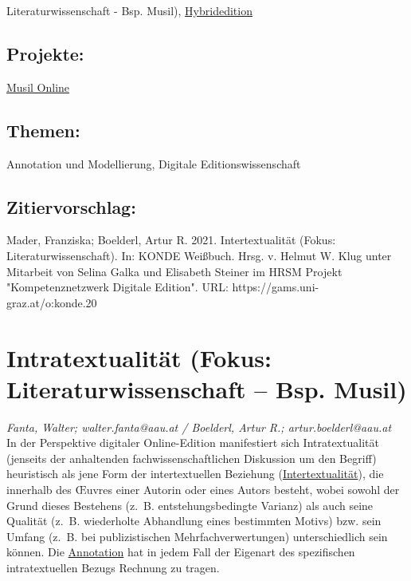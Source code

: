 \documentclass{article}
\begin{document}
{                           Literaturwissenschaft - Bsp. Musil)}, \href{https://gams.uni-graz.at/o:konde.96}{Hybridedition}\subsection*{Projekte:}\href{http://musilonline.at}{Musil Online}\subsection*{Themen:}Annotation und Modellierung, Digitale Editionswissenschaft\subsection*{Zitiervorschlag:}Mader, Franziska; Boelderl, Artur R. 2021. Intertextualität (Fokus: Literaturwissenschaft). In: KONDE Weißbuch. Hrsg. v. Helmut W. Klug unter Mitarbeit von Selina Galka und Elisabeth Steiner im HRSM Projekt "Kompetenznetzwerk Digitale Edition". URL: https://gams.uni-graz.at/o:konde.20\newpage\section*{Intratextualität (Fokus: Literaturwissenschaft – Bsp. Musil)} \emph{Fanta, Walter; walter.fanta@aau.at / Boelderl, Artur R.;
                  artur.boelderl@aau.at}\\
        
    In der Perspektive digitaler Online-Edition manifestiert sich Intratextualität
                  (jenseits der anhaltenden fachwissenschaftlichen Diskussion um den Begriff)
                  heuristisch als jene Form der intertextuellen Beziehung (\href{http://gams.uni-graz.at/o:konde.20}{Intertextualität}), die innerhalb des Œuvres einer
                  Autorin oder eines Autors besteht, wobei sowohl der Grund dieses Bestehens (z. B.
                  entstehungsbedingte Varianz) als auch seine Qualität (z. B. wiederholte Abhandlung
                  eines bestimmten Motivs) bzw. sein Umfang (z. B. bei publizistischen
                  Mehrfachverwertungen) unterschiedlich sein können. Die \href{http://gams.uni-graz.at/o:konde.17}{Annotation} hat in jedem Fall der Eigenart des
                  spezifischen intratextuellen Bezugs Rechnung zu tragen.\\
            
\end{document}
